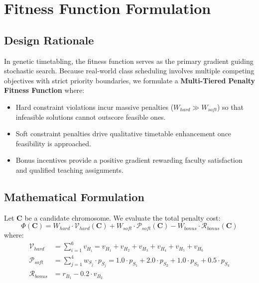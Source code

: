 
\chapter{Fitness Function Formulation}

\section{Design Rationale}
In genetic timetabling, the fitness function serves as the primary gradient guiding stochastic search. Because real-world class scheduling involves multiple competing objectives with strict priority boundaries, we formulate a \textbf{Multi-Tiered Penalty Fitness Function} where:
\begin{itemize}[leftmargin=1.5em]
  \item Hard constraint violations incur massive penalties ($W_{hard} \gg W_{soft}$) so that infeasible solutions cannot outscore feasible ones.
  \item Soft constraint penalties drive qualitative timetable enhancement once feasibility is approached.
  \item Bonus incentives provide a positive gradient rewarding faculty satisfaction and qualified teaching assignments.
\end{itemize}

\section{Mathematical Formulation}
Let $\mathbf{C}$ be a candidate chromosome. We evaluate the total penalty cost:
\begin{equation}
  \Phi(\mathbf{C}) = W_{hard} \cdot \mathcal{V}_{hard}(\mathbf{C}) + W_{soft} \cdot \mathcal{P}_{soft}(\mathbf{C}) - W_{bonus} \cdot \mathcal{R}_{bonus}(\mathbf{C})
\end{equation}
where:
\begin{align}
  \mathcal{V}_{hard} &= \sum_{i=1}^{6} v_{H_i} = v_{H_1} + v_{H_2} + v_{H_3} + v_{H_4} + v_{H_5} + v_{H_6} \\
  \mathcal{P}_{soft} &= \sum_{j=1}^{4} w_{S_j} \cdot p_{S_j} = 1.0 \cdot p_{S_1} + 2.0 \cdot p_{S_2} + 1.0 \cdot p_{S_3} + 0.5 \cdot p_{S_4} \\
  \mathcal{R}_{bonus} &= r_{B_1} - 0.2 \cdot v_{B_2}
\end{align}

